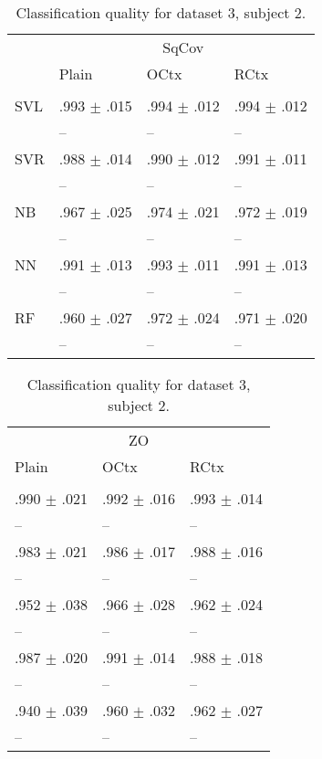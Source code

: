 \begin{table}[htb]
\renewcommand{\arraystretch}{0.6}
\centering
\footnotesize
\caption{Classification quality for dataset 3, subject 2.\label{table:Set3_patient2_res}}
\begin{tabular}{llll}
 & \multicolumn{3}{c}{SqCov} \\
 & Plain & OCtx & RCtx \\
 \cmidrule(lr){2-4}\\
SVL & .993 $\pm$ .015 & .994 $\pm$ .012 & .994 $\pm$ .012 \\
 & -- & -- & -- \\
SVR & .988 $\pm$ .014 & .990 $\pm$ .012 & .991 $\pm$ .011 \\
 & -- & -- & -- \\
NB & .967 $\pm$ .025 & .974 $\pm$ .021 & .972 $\pm$ .019 \\
 & -- & -- & -- \\
NN & .991 $\pm$ .013 & .993 $\pm$ .011 & .991 $\pm$ .013 \\
 & -- & -- & -- \\
RF & .960 $\pm$ .027 & .972 $\pm$ .024 & .971 $\pm$ .020 \\
 & -- & -- & -- \\
\end{tabular}%
\begin{tabular}{lll}
 \multicolumn{3}{c}{ZO} \\
  Plain & OCtx & RCtx \\
  \cmidrule(lr){1-3}\\
 .990 $\pm$ .021 & .992 $\pm$ .016 & .993 $\pm$ .014 \\
 -- & -- & -- \\
 .983 $\pm$ .021 & .986 $\pm$ .017 & .988 $\pm$ .016 \\
  -- & -- & -- \\
 .952 $\pm$ .038 & .966 $\pm$ .028 & .962 $\pm$ .024 \\
  -- & -- & -- \\
.987 $\pm$ .020 & .991 $\pm$ .014 & .988 $\pm$ .018 \\
 -- & -- & -- \\
 .940 $\pm$ .039 & .960 $\pm$ .032 & .962 $\pm$ .027 \\
  -- & -- & -- \\
\end{tabular}
\end{table}

